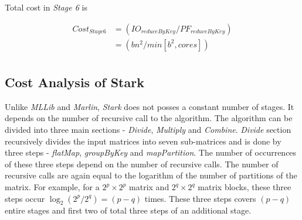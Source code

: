 Total cost in \textit{Stage 6} is

\begin{equation}
    \begin{aligned}
        Cost_{Stage 6}&=(IO_{reduceByKey}/PF_{reduceByKey}) \\
        &=(bn^{2}/min[b^{2}, cores]) \\
    \end{aligned}
\end{equation}



\subsection{Cost Analysis of Stark}
Unlike \textit{MLLib} and \textit{Marlin}, \textit{Stark} does not posses a constant number of stages. It depends on the number of recursive call to the algorithm. The algorithm can be divided into three main sections - \textit{Divide}, \textit{Multiply} and \textit{Combine}. \textit{Divide} section recursively divides the input matrices into seven sub-matrices and is done by three steps - \textit{flatMap}, \textit{groupByKey} and \textit{mapPartition}. The number of occurrences of these three steps depend on the number of recursive calls. The number of recursive calls are again equal to the logarithm of the number of partitions of the matrix. For example, for a $2^{p}\times 2^{p}$ matrix and $2^{q}\times 2^{q}$ matrix blocks, these three steps occur $\log_2(2^{p}/2^{q}) = (p-q)$ times. These three steps covers $(p-q)$ entire stages and first two of total three steps of an additional stage.

